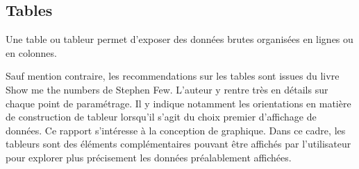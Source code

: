 \documentclass[a4paper,12pt]{article}
\begin{document}
\begin{multicols}{2}
\subsection*{Tables}
\label{sec:org7325331}
Une table ou tableur permet d'exposer des données brutes organisées en lignes ou en colonnes.

Sauf mention contraire, les recommendations sur les tables sont issues du livre \og Show me the numbers\fg{} de Stephen Few.\autocite{stephenfew8TableDesign2012} L'auteur y rentre très en détails sur chaque point de paramétrage. Il y indique notamment les orientations en matière de construction de tableur lorsqu'il s'agit du choix premier d'affichage de données. Ce rapport s'intéresse à la conception de graphique. Dans ce cadre, les tableurs sont des éléments complémentaires pouvant être affichés par l'utilisateur pour explorer plus précisement les données préalablement affichées.


\end{multicols}
\end{document}
